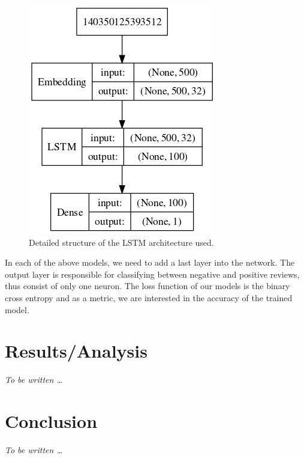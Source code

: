 \documentclass[conference]{IEEEtran}
\theoremstyle{plain}
\theoremstyle{definition}
\theoremstyle{remark}
\begin{document}
\begin{figure}[tbh!]
	\centering
	\includegraphics[width=.4\linewidth]{model_LSTM.png}
	\caption[bla.]{Detailed structure of the LSTM architecture used.}
	\label{fig:lstm}
\end{figure}
In each of the above models, we need to add a last layer into the network. The output layer is responsible for classifying between negative and positive reviews, thus consist of only one neuron. The loss function of our models is the binary cross entropy and as a metric, we are interested in the accuracy of the trained model. 


\section{Results/Analysis}
\label{sec:analysis}

\textit{To be written \dots}

\section{Conclusion}
\label{sec:concl}

\textit{To be written \dots}

%





%
\end{document}
